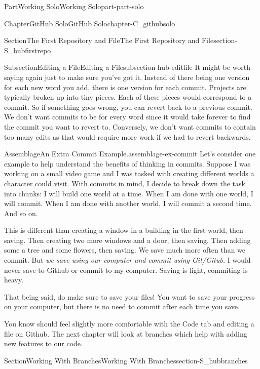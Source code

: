 \documentclass[oneside,10pt,]{book}
\begin{document}
\begin{partptx}{Part}{Working Solo}{}{Working Solo}{}{}{part-part-solo}
\begin{chapterptx}{Chapter}{GitHub Solo}{}{GitHub Solo}{}{}{chapter-C_githubsolo}
\begin{sectionptx}{Section}{The First Repository and File}{}{The First Repository and File}{}{}{section-S_hubfirstrepo}
\begin{subsectionptx}{Subsection}{Editing a File}{}{Editing a File}{}{}{subsection-hub-editfile}
It might be worth saying again just to make sure you've got it. Instead of there being one version for each new word you add, there is one version for each commit. Projects are typically broken up into tiny pieces. Each of these pieces would correspond to a commit. So if something goes wrong, you can revert back to a previous commit. We don't want commits to be for every word since it would take forever to find the commit you want to revert to. Conversely, we don't want commits to contain too many edits as that would require more work if we had to revert backwards.%
\begin{assemblage}{Assemblage}{An Extra Commit Example.}{assemblage-ex-commit}%
Let's consider one example to help understand the benefits of thinking in commits. Suppose I was working on a small video game and I was tasked with creating different worlds a character could visit. With commits in mind, I decide to break down the task into chunks: I will build one world at a time. When I am done with one world, I will commit. When I am done with another world, I will commit a second time. And so on.%
\par
This is different than creating a window in a building in the first world, then saving. Then creating two more windows and a door, then saving. Then adding some a tree and some flowers, then saving. We save much more often than we commit. But \emph{we save using our computer and commit using Git\slash{}Gitub.} I would never save to Github or commit to my computer. Saving is light, commiting is heavy.%
\par
That being said, do make sure to save your files! You want to save your progress on your computer, but there is no need to commit after each time you save.%
\end{assemblage}
\end{subsectionptx}
\begin{conclusion}{}%
You know should feel slightly more comfortable with the Code tab and editing a file on Github. The next chapter will look at branches which help with adding new features to our code.%
\end{conclusion}%
\end{sectionptx}
%
%
\typeout{************************************************}
\typeout{************************************************}
%
\begin{sectionptx}{Section}{Working With Branches}{}{Working With Branches}{}{}{section-S_hubbranches}
%
%

\end{sectionptx}
\end{chapterptx}
\end{partptx}
\end{document}
